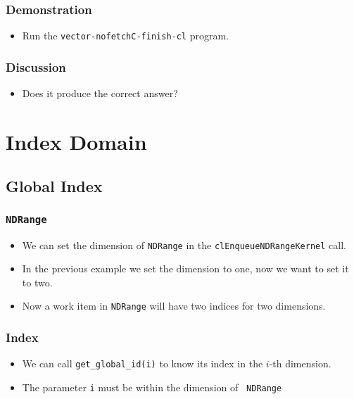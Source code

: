 \documentclass{beamer}
\begin{document}
\begin{frame}
  \frametitle{Demonstration}
  \begin{itemize}
    \item Run the {\tt vector-nofetchC-finish-cl} program.
  \end{itemize}
\end{frame}

\begin{frame}
  \frametitle{Discussion}
  \begin{itemize}
  \item Does it produce the correct answer?
  \end{itemize}
\end{frame}

\section{Index Domain}

\subsection{Global Index}

\begin{frame}
  \frametitle{\tt NDRange} 
  \begin{itemize}
    \item We can set the dimension of {\tt NDRange} in the
      {\tt clEnqueueNDRangeKernel} call.
    \item In the previous example we set the dimension to one, now we
      want to set it to two.
    \item Now a work item in {\tt NDRange} will have two indices for
      two dimensions.
  \end{itemize}
\end{frame}

\begin{frame}
  \frametitle{Index}
  \begin{itemize}
    \item We can call {\tt get\_global\_id(i)} to know its index in
      the $i$-th dimension.
    \item The parameter {\tt i} must be within the dimension of {\tt
      NDRange}
  \end{itemize}
\end{frame}

\begin{frame}
\end{frame}
\end{document}
